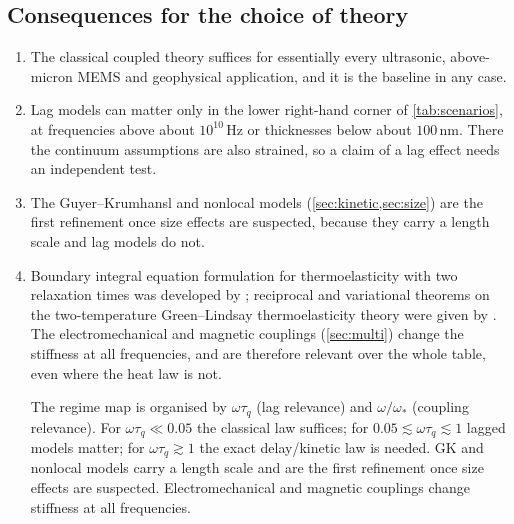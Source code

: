 \subsection{Consequences for the choice of theory}
\begin{enumerate}
\item The classical coupled theory suffices for essentially every ultrasonic, above-micron MEMS and geophysical application, and it is the baseline in any case.
\item Lag models can matter only in the lower right-hand corner of \cref{tab:scenarios}, at frequencies above about $10^{10}$\,Hz or thicknesses below about $100$\,nm. There the continuum assumptions are also strained, so a claim of a lag effect needs an independent test.
\item The Guyer--Krumhansl and nonlocal models (\cref{sec:kinetic,sec:size}) are the first refinement once size effects are suspected, because they carry a length scale and lag models do not.
\item Boundary integral equation formulation for thermoelasticity with two relaxation times was developed by \citep{Anwar1994}; reciprocal and variational theorems on the two-temperature Green--Lindsay thermoelasticity theory were given by \citep{Sachan2022}. The electromechanical and magnetic couplings (\cref{sec:multi}) change the stiffness at all frequencies, and are therefore relevant over the whole table, even where the heat law is not.

\begin{summarybox}[Summary]
The regime map is organised by $\omega\tau_q$ (lag relevance) and $\omega/\omega_*$ (coupling relevance). For $\omega\tau_q\ll0.05$ the classical law suffices; for $0.05\lesssim\omega\tau_q\lesssim1$ lagged models matter; for $\omega\tau_q\gtrsim1$ the exact delay/kinetic law is needed. GK and nonlocal models carry a length scale and are the first refinement once size effects are suspected. Electromechanical and magnetic couplings change stiffness at all frequencies.
\end{summarybox}
\end{enumerate}
